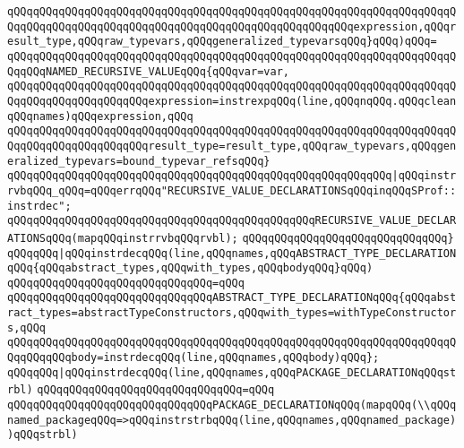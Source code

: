 \verb|qQQqqQQqqQQqqQQqqQQqqQQqqQQqqQQqqQQqqQQqqQQqqQQqqQQqqQQqqQQqqQQqqQQqqQQqqQQqqQQqqQQqqQQqqQQqqQQqqQQqqQQqqQQqqQQqqQQqqQQqqQQqexpression,qQQqresult_type,qQQqraw_typevars,qQQqgeneralized_typevarsqQQq}qQQq)qQQq=|\newline
\verb|qQQqqQQqqQQqqQQqqQQqqQQqqQQqqQQqqQQqqQQqqQQqqQQqqQQqqQQqqQQqqQQqqQQqqQQqqQQqNAMED_RECURSIVE_VALUEqQQq{qQQqvar=var,|\newline
\verb|qQQqqQQqqQQqqQQqqQQqqQQqqQQqqQQqqQQqqQQqqQQqqQQqqQQqqQQqqQQqqQQqqQQqqQQqqQQqqQQqqQQqqQQqqQQqexpression=instrexpqQQq(line,qQQqnqQQq.qQQqcleanqQQqnames)qQQqexpression,qQQq|\newline
\verb|qQQqqQQqqQQqqQQqqQQqqQQqqQQqqQQqqQQqqQQqqQQqqQQqqQQqqQQqqQQqqQQqqQQqqQQqqQQqqQQqqQQqqQQqqQQqresult_type=result_type,qQQqraw_typevars,qQQqgeneralized_typevars=bound_typevar_refsqQQq}|\newline
\verb|qQQqqQQqqQQqqQQqqQQqqQQqqQQqqQQqqQQqqQQqqQQqqQQqqQQqqQQqqQQq|\verb#|qQQqinstrrvbqQQq_qQQq=qQQqerrqQQq"RECURSIVE_VALUE_DECLARATIONSqQQqinqQQqSProf::instrdec";#\newline
\newline
\verb|qQQqqQQqqQQqqQQqqQQqqQQqqQQqqQQqqQQqqQQqqQQqqQQqRECURSIVE_VALUE_DECLARATIONSqQQq(mapqQQqinstrrvbqQQqrvbl);|\newline
\verb|qQQqqQQqqQQqqQQqqQQqqQQqqQQqqQQq}|\newline
\newline
\verb|qQQqqQQq|\verb#|qQQqinstrdecqQQq(line,qQQqnames,qQQqABSTRACT_TYPE_DECLARATIONqQQq{qQQqabstract_types,qQQqwith_types,qQQqbodyqQQq}qQQq)#\newline
\verb|qQQqqQQqqQQqqQQqqQQqqQQqqQQqqQQq=qQQq|\newline
\verb|qQQqqQQqqQQqqQQqqQQqqQQqqQQqqQQqABSTRACT_TYPE_DECLARATIONqQQq{qQQqabstract_types=abstractTypeConstructors,qQQqwith_types=withTypeConstructors,qQQq|\newline
\verb|qQQqqQQqqQQqqQQqqQQqqQQqqQQqqQQqqQQqqQQqqQQqqQQqqQQqqQQqqQQqqQQqqQQqqQQqqQQqqQQqbody=instrdecqQQq(line,qQQqnames,qQQqbody)qQQq};|\newline
\newline
\verb|qQQqqQQq|\verb#|qQQqinstrdecqQQq(line,qQQqnames,qQQqPACKAGE_DECLARATIONqQQqstrbl)#\newline
\verb|qQQqqQQqqQQqqQQqqQQqqQQqqQQqqQQq=qQQq|\newline
\verb|qQQqqQQqqQQqqQQqqQQqqQQqqQQqqQQqPACKAGE_DECLARATIONqQQq(mapqQQq(\\qQQqnamed_packageqQQq=>qQQqinstrstrbqQQq(line,qQQqnames,qQQqnamed_package))qQQqstrbl)|\newline
